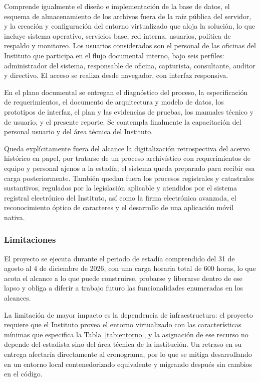 Comprende igualmente el diseño e implementación de la base de datos, el esquema de almacenamiento de los archivos fuera de la raíz pública del servidor, y la creación y configuración del entorno virtualizado que aloja la solución, lo que incluye sistema operativo, servicios base, red interna, usuarios, política de respaldo y monitoreo. Los usuarios considerados son el personal de las oficinas del Instituto que participa en el flujo documental interno, bajo seis perfiles: administrador del sistema, responsable de oficina, capturista, consultante, auditor y directivo. El acceso se realiza desde navegador, con interfaz responsiva.

En el plano documental se entregan el diagnóstico del proceso, la especificación de requerimientos, el documento de arquitectura y modelo de datos, los prototipos de interfaz, el plan y las evidencias de pruebas, los manuales técnico y de usuario, y el presente reporte. Se contempla finalmente la capacitación del personal usuario y del área técnica del Instituto.

Queda explícitamente fuera del alcance la digitalización retrospectiva del acervo histórico en papel, por tratarse de un proceso archivístico con requerimientos de equipo y personal ajenos a la estadía; el sistema queda preparado para recibir esa carga posteriormente. También quedan fuera los procesos registrales y catastrales sustantivos, regulados por la legislación aplicable \cite{leyrpp2008, leycatastro2001} y atendidos por el sistema registral electrónico del Instituto, así como la firma electrónica avanzada, el reconocimiento óptico de caracteres y el desarrollo de una aplicación móvil nativa.

\subsubsection{Limitaciones} \label{subsec:limitaciones}

El proyecto se ejecuta durante el periodo de estadía comprendido del 31 de agosto al 4 de diciembre de 2026, con una carga horaria total de 600 horas, lo que acota el alcance a lo que puede construirse, probarse y liberarse dentro de ese lapso y obliga a diferir a trabajo futuro las funcionalidades enumeradas en los alcances.

La limitación de mayor impacto es la dependencia de infraestructura: el proyecto requiere que el Instituto provea el entorno virtualizado con las características mínimas que especifica la Tabla~\ref{tab:entorno}, y la asignación de ese recurso no depende del estadista sino del área técnica de la institución. Un retraso en su entrega afectaría directamente al cronograma, por lo que se mitiga desarrollando en un entorno local contenedorizado equivalente y migrando después sin cambios en el código.

